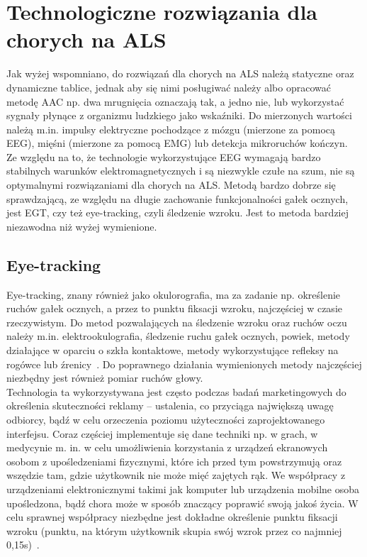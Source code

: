 \documentclass[twoside,a4paper]{book}
\begin{document}
\section{Technologiczne rozwiązania dla chorych na ALS}

Jak wyżej wspomniano, do rozwiązań dla chorych na ALS należą statyczne oraz dynamiczne tablice, jednak aby się nimi posługiwać należy albo opracować metodę AAC  np. dwa mrugnięcia oznaczają tak, a jedno nie, lub wykorzystać sygnały płynące z organizmu ludzkiego jako wskaźniki. Do mierzonych wartości należą m.in. impulsy elektryczne pochodzące z mózgu (mierzone za pomocą EEG), mięśni (mierzone za pomocą EMG) lub detekcja mikroruchów kończyn.~\cite{eyemouse} Ze względu na to, że technologie wykorzystujące  EEG wymagają bardzo stabilnych warunków elektromagnetycznych i są niezwykle czułe na szum, nie są optymalnymi rozwiązaniami dla chorych na ALS. Metodą bardzo dobrze się sprawdzającą, ze względu na długie zachowanie funkcjonalności gałek ocznych, jest EGT, czy też eye-tracking, czyli śledzenie wzroku. Jest to metoda bardziej niezawodna niż wyżej wymienione. 
\subsection{Eye-tracking} 

Eye-tracking, znany również jako okulorografia,  ma za zadanie np. określenie ruchów gałek ocznych, a przez to  punktu fiksacji wzroku,  najczęściej w czasie rzeczywistym. Do metod pozwalających na śledzenie wzroku oraz ruchów oczu należy m.in. elektrookulografia, śledzenie ruchu gałek ocznych, powiek, metody działające w oparciu o szkła kontaktowe, metody wykorzystujące refleksy na rogówce lub źrenicy~\cite{eyemouse}. Do poprawnego działania wymienionych metody najczęściej niezbędny jest również pomiar ruchów głowy.
\\ Technologia ta wykorzystywana jest często podczas badań marketingowych do określenia skuteczności reklamy – ustalenia, co przyciąga największą uwagę odbiorcy, bądź w celu orzeczenia poziomu użyteczności zaprojektowanego interfejsu.
Coraz częściej implementuje się dane techniki  np. w grach,  w medycynie m. in. w celu umożliwienia korzystania z urządzeń ekranowych osobom z upośledzeniami fizycznymi, które ich przed tym powstrzymują oraz wszędzie tam, gdzie użytkownik nie może mięć zajętych rąk. We współpracy z urządzeniami elektronicznymi takimi jak  komputer lub urządzenia mobilne osoba upośledzona, bądź chora może w sposób znaczący poprawić swoją jakoś życia. W celu sprawnej współpracy niezbędne jest dokładne określenie punktu fiksacji wzroku (punktu, na którym użytkownik skupia swój wzrok przez co najmniej 0,15s)~\cite{kunkaUwaga}.
\end{document}
